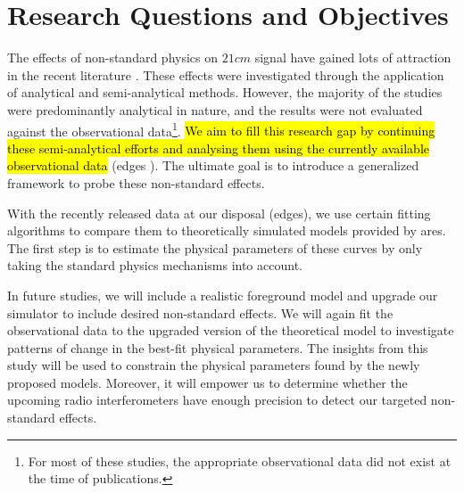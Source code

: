 \documentclass[12pt, TexShade, letterpaper]{report}
\begin{document}
\section{Research Questions and Objectives}
The effects of non-standard physics on $21cm$ signal have gained lots of attraction in the recent literature \cite{WF_effect_oscar, constrain_dm_21, bh_cosmioc_dawn, cosmic_string_oscar}. These effects were investigated through the application of analytical and semi-analytical methods. However, the majority of the studies were predominantly analytical in nature, and the results were not evaluated against the observational data\footnote{For most of these studies, the appropriate observational data did not exist at the time of publications.}. \hl{We aim to fill this research gap by continuing these semi-analytical efforts and analysing them using the currently available observational data} (\gls{edges} \cite{edges}). The ultimate goal is to introduce a generalized framework to probe these non-standard effects.\par
With the recently released data at our disposal (\gls{edges}\cite{edges}), we use certain fitting algorithms to compare them to theoretically simulated models provided by \gls{ares}\cite{ares2014jordan}. 
The first step is to estimate the physical parameters of these curves by only taking the standard physics mechanisms into account.\par
In future studies, we will include a realistic foreground model and upgrade our simulator to include desired non-standard effects. We will again fit the observational data to the upgraded version of the theoretical model to investigate patterns of change in the best-fit physical parameters. The insights from this study will be used to constrain the physical parameters found by the newly proposed models. Moreover, it will empower us to determine whether the upcoming radio interferometers have enough precision to detect our targeted non-standard effects.\par
\end{document}
